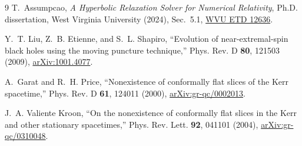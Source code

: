 \documentclass[11pt]{article}
\begin{document}
\begin{thebibliography}{9}
T.~Assumpcao,
\emph{A Hyperbolic Relaxation Solver for Numerical Relativity},
Ph.D. dissertation, West Virginia University (2024), Sec.~5.1,
\href{https://researchrepository.wvu.edu/etd/12636}{WVU ETD 12636}.

Y.~T. Liu, Z.~B. Etienne, and S.~L. Shapiro,
``Evolution of near-extremal-spin black holes using the moving puncture technique,''
Phys. Rev. D \textbf{80}, 121503 (2009),
\href{https://arxiv.org/abs/1001.4077}{arXiv:1001.4077}.

A.~Garat and R.~H. Price,
``Nonexistence of conformally flat slices of the Kerr spacetime,''
Phys. Rev. D \textbf{61}, 124011 (2000),
\href{https://arxiv.org/abs/gr-qc/0002013}{arXiv:gr-qc/0002013}.

J.~A. Valiente Kroon,
``On the nonexistence of conformally flat slices in the Kerr and other stationary spacetimes,''
Phys. Rev. Lett. \textbf{92}, 041101 (2004),
\href{https://arxiv.org/abs/gr-qc/0310048}{arXiv:gr-qc/0310048}.
\end{thebibliography}
\end{document}
